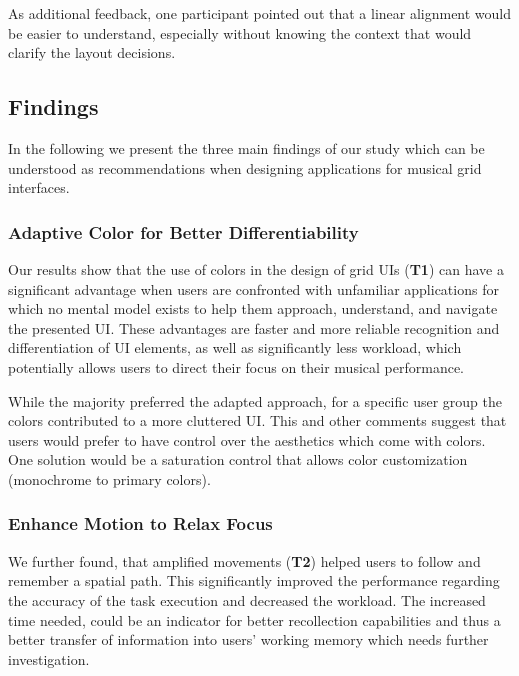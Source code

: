 \documentclass[sigconf]{nimeart}
\begin{document}
As additional feedback, one participant pointed out that a linear alignment would be easier to understand, especially without knowing the context that would clarify the layout decisions.

\subsection{Findings}\label{findings}

In the following we present the three main findings of our study which can be understood as recommendations when designing applications for musical grid interfaces.

\subsubsection{Adaptive Color for Better Differentiability}\label{adaptive-color-for-better-differentiability}

Our results show that the use of colors in the design of grid UIs (\textbf{T1}) can have a significant advantage when users are confronted with unfamiliar applications for which no mental model exists to help them approach, understand, and navigate the presented UI. These advantages are faster and more reliable recognition and differentiation of UI elements, as well as significantly less workload, which potentially allows users to direct their focus on their musical performance.

While the majority preferred the adapted approach, for a specific user group the colors contributed to a more cluttered UI. This and other comments suggest that users would prefer to have control over the aesthetics which come with colors. One solution would be a saturation control that allows color customization (monochrome to primary colors).

\subsubsection{Enhance Motion to Relax Focus}\label{enhance-motion-to-relax-focus}

We further found, that amplified movements (\textbf{T2}) helped users to follow and remember a spatial path. This significantly improved the performance regarding the accuracy of the task execution and decreased the workload. The increased time needed, could be an indicator for better recollection capabilities and thus a better transfer of information into users' working memory which needs further investigation.
\end{document}
